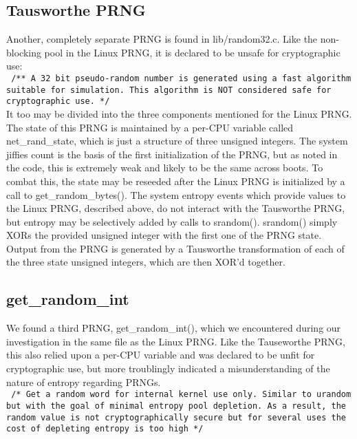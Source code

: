 \subsection{Tausworthe PRNG}
Another, completely separate PRNG is found in lib/random32.c.  Like the non-blocking pool in the Linux PRNG, it is declared to be unsafe for cryptographic use:
\\
\texttt{
/**                                                                             
       A 32 bit pseudo-random number is generated using a fast                 
       algorithm suitable for simulation. This algorithm is NOT                
       considered safe for cryptographic use.                                  
 */
}  
\\
It too may be divided into the three components mentioned for the Linux PRNG.  The state of this PRNG is maintained by a per-CPU variable called net\_rand\_state, which is just a structure of three unsigned integers.  The system jiffies count is the basis of the first initialization of the PRNG, but as noted in the code, this is extremely weak and likely to be the same across boots.  To combat this, the state may be reseeded after the Linux PRNG is initialized by a call to get\_random\_bytes().   The system entropy events which provide values to the Linux PRNG, described above, do not interact with the Tausworthe PRNG, but entropy may be selectively added by calls to srandom(). srandom() simply XORs the provided unsigned integer with the first one of the PRNG state.  Output from the PRNG is generated by a Tausworthe transformation of each of the three state unsigned integers, which are then XOR'd together.

\subsection{get\_random\_int}
We found a third PRNG, get\_random\_int(), which we encountered during our investigation in the same file as the Linux PRNG. Like the Tauseworthe PRNG, this also relied upon a per-CPU variable and was declared to be unfit for cryptographic use, but more troublingly indicated a misunderstanding of the nature of entropy regarding PRNGs. 
\\
\texttt{
/*                                                                              
  Get a random word for internal kernel use only. Similar to urandom but       
  with the goal of minimal entropy pool depletion. As a result, the random     
  value is not cryptographically secure but for several uses the cost of       
  depleting entropy is too high                                                
 */
}
\\

